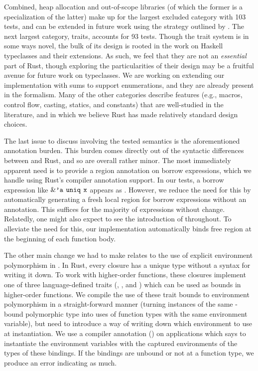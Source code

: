 Combined, heap allocation and out-of-scope libraries (of which the former is a
specialization of the latter) make up for the largest excluded category with 103
tests, and can be extended in future work using the strategy outlined by
\citet{weiss19:oxide}. The next largest category, traits, accounts for 93 tests.
Though the trait system is in some ways novel, the bulk of its design is rooted
in the work on Haskell typeclasses and their extensions. As such, we feel that
they are not an \emph{essential} part of Rust, though exploring the
particularities of their design may be a fruitful avenue for future work on
typeclasses. We are working on extending our implementation with sums to support
enumerations, and they are already present in the formalism. Many of the other
categories describe features (e.g., macros, control flow, casting, statics, and
constants) that are well-studied in the literature, and in which we believe Rust
has made relatively standard design choices.

The last issue to discuss involving the tested semantics is the aforementioned
annotation burden. This burden comes directly out of the syntactic differences
between \lang and Rust, and so are overall rather minor. The most immediately
apparent need is to provide a region annotation on borrow expressions, which we
handle using Rust's compiler annotation support. In our tests, a borrow
expression like $\&\texttt{'a} \: \,\mathtt{uniq}\, \: \texttt{x}$ appears as
. However, we reduce the need for this by automatically
generating a fresh local region for borrow expressions without an annotation.
This suffices for the majority of expressions without change. Relatedly, one
might also expect to see the introduction of  throughout. To
alleviate the need for this, our implementation automatically binds free region
at the beginning of each function body.

The other main change we had to make relates to the use of explicit environment
polymorphism in \lang. In Rust, every closure has a unique type without a syntax
for writing it down. To work with higher-order functions, these closures
implement one of three language-defined traits (, , and
) which can be used as bounds in higher-order functions. We
compile the use of these trait bounds to environment polymorphism in a
straight-forward manner (turning instances of the same -bound
polymorphic type into uses of function types with the same environment
variable), but need to introduce a way of writing down which environment to use
at instantiation. We use a compiler annotation (\rusti{#[envs(c1, ..., cn)]}) on
applications which says to instantiate the environment variables with the
captured environments of the types of these bindings. If the bindings are
unbound or not at a function type, we produce an error indicating as much.


